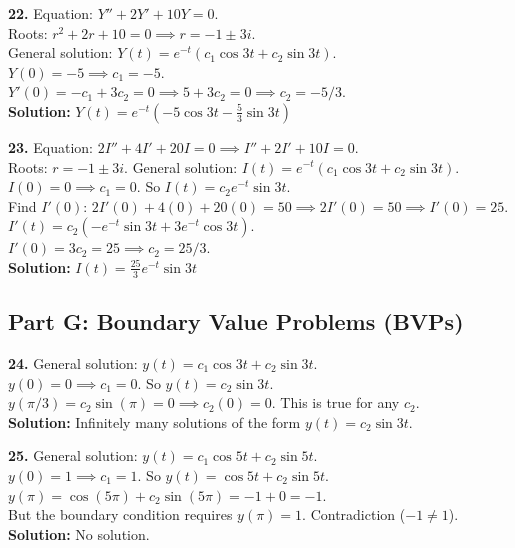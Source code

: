 \documentclass[11pt]{article}
\begin{document}
\vspace{0.5cm}
\noindent\textbf{22.} Equation: $Y'' + 2Y' + 10Y = 0$. \\
Roots: $r^2 + 2r + 10 = 0 \implies r = -1 \pm 3i$. \\
General solution: $Y(t) = e^{-t}(c_1 \cos 3t + c_2 \sin 3t)$. \\
$Y(0) = -5 \implies c_1 = -5$. \\
$Y'(0) = -c_1 + 3c_2 = 0 \implies 5 + 3c_2 = 0 \implies c_2 = -5/3$. \\
\textbf{Solution:} $Y(t) = e^{-t}\left(-5\cos 3t - \frac{5}{3}\sin 3t\right)$

\vspace{0.5cm}
\noindent\textbf{23.} Equation: $2I'' + 4I' + 20I = 0 \implies I'' + 2I' + 10I = 0$. \\
Roots: $r = -1 \pm 3i$. General solution: $I(t) = e^{-t}(c_1 \cos 3t + c_2 \sin 3t)$. \\
$I(0) = 0 \implies c_1 = 0$. So $I(t) = c_2e^{-t}\sin 3t$. \\
Find $I'(0)$: $2I'(0) + 4(0) + 20(0) = 50 \implies 2I'(0) = 50 \implies I'(0) = 25$. \\
$I'(t) = c_2(-e^{-t}\sin 3t + 3e^{-t}\cos 3t)$. \\
$I'(0) = 3c_2 = 25 \implies c_2 = 25/3$. \\
\textbf{Solution:} $I(t) = \frac{25}{3}e^{-t}\sin 3t$

\subsection*{Part G: Boundary Value Problems (BVPs)}
\textbf{24.} General solution: $y(t) = c_1 \cos 3t + c_2 \sin 3t$. \\
$y(0) = 0 \implies c_1 = 0$. So $y(t) = c_2 \sin 3t$. \\
$y(\pi/3) = c_2 \sin(\pi) = 0 \implies c_2(0) = 0$. This is true for any $c_2$. \\
\textbf{Solution:} Infinitely many solutions of the form $y(t) = c_2 \sin 3t$.

\vspace{0.5cm}
\noindent\textbf{25.} General solution: $y(t) = c_1 \cos 5t + c_2 \sin 5t$. \\
$y(0) = 1 \implies c_1 = 1$. So $y(t) = \cos 5t + c_2 \sin 5t$. \\
$y(\pi) = \cos(5\pi) + c_2 \sin(5\pi) = -1 + 0 = -1$. \\
But the boundary condition requires $y(\pi) = 1$. Contradiction ($-1 \neq 1$). \\
\textbf{Solution:} No solution.
\end{document}
